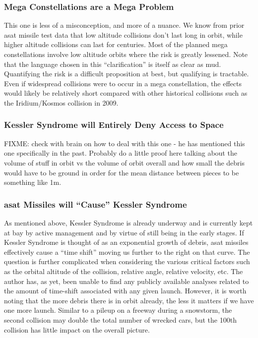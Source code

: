 \subsubsection{Mega Constellations are a Mega Problem}
This one is less of a misconception, and more of a nuance.  We know
from prior \ac{asat} missile test data that low altitude collisions
don't last long in orbit, while higher altitude collisions can last
for centuries.\cite{XXX} Most of the planned mega constellations
involve low altitude orbits where the risk is greatly
lessened.\cite[cite my own work maybe?]{XXX} Note that the language
chosen in this ``clarification'' is itself as clear as mud.
Quantifying the risk is a difficult proposition at best, but
qualifying is tractable.  Even if widespread collisions were to occur
in a mega constellation, the effects would likely be relatively short
compared with other historical collisions such as the Iridium/Kosmos
collision in 2009.\cite[my own youtube video maybe?]{xxx}

\subsubsection{Kessler Syndrome will Entirely Deny Access to Space}
FIXME: check with brain on how to deal with this one - he has
mentioned this one specifically in the past.  Probably do a little
proof here talking about the volume of stuff in orbit vs the volume of
orbit overall and how small the debris would have to be ground in
order for the mean distance between pieces to be something like 1m.

\subsubsection{\ac{asat} Missiles will ``Cause'' Kessler Syndrome}
As mentioned above, Kessler Syndrome is already underway and is
currently kept at bay by active management and by virtue of still
being in the early stages.  If Kessler Syndrome is thought of as an
exponential growth of debris, \ac{asat} missiles effectively cause a
``time shift'' moving us further to the right on that curve.  The
question is further complicated when considering the various critical
factors such as the orbital altitude of the collision, relative angle,
relative velocity, etc.  The author has, as yet, been unable to find
any publicly available analyses related to the amount of time-shift
associated with any given launch.  However, it is worth noting that
the more debris there is in orbit already, the less it matters if we
have one more launch.  Similar to a pileup on a freeway during a
snowstorm, the second collision may double the total number of wrecked
cars, but the 100th collision has little impact on the overall
picture.
